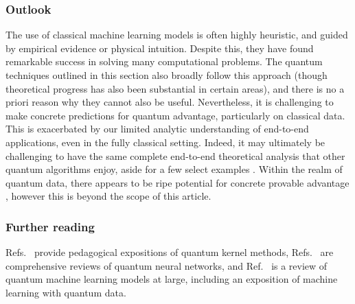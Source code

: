 \begin{refsection}
\subsubsection*{Outlook}
The use of classical machine learning models is often highly heuristic, and guided by empirical evidence or physical intuition. Despite this, they have found remarkable success in solving many computational problems. The quantum techniques outlined in this section also broadly follow this approach (though theoretical progress has also been substantial in certain areas), and there is no a priori reason why they cannot also be useful. Nevertheless, it is challenging to make concrete predictions for quantum advantage, particularly on classical data. This is exacerbated by our limited analytic understanding of end-to-end applications, even in the fully classical setting. Indeed, it may ultimately be challenging to have the same complete end-to-end theoretical analysis that other quantum algorithms enjoy, aside for a few select examples \cite{schuld2022IsQuantumAdvatnage}. Within the realm of quantum data, there appears to be ripe potential for concrete provable advantage \cite{huang2022quantumadvantage, chen2022exponentialseparations, caro2022OutOfDistGeneralization}, however this is beyond the scope of this article.

\subsubsection*{Further reading}\label{sec:qmodel-reading}Refs.~\cite{schuld2021kernelmethods, hubregtsen2021trainingKernels} provide pedagogical expositions of quantum kernel methods, Refs.~\cite{benedetti2019PQCreview, cerezo2020variationalreview} are comprehensive reviews of quantum neural networks, and Ref.~\cite{cerezo2022challenges} is a review of quantum machine learning models at large, including an exposition of machine learning with quantum data.

\printbibliography[heading=secbib,segment=\therefsegment]
\end{refsection}